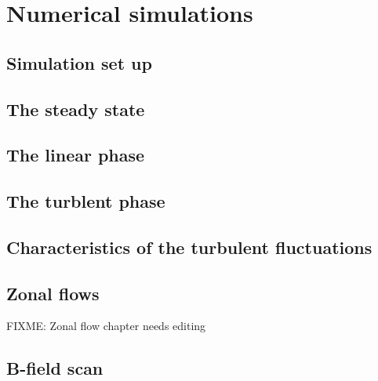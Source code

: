 \documentclass[12pt,a4paper,oneside,openright]{report} %
\begin{document}
% 
% 
% 
% 
% 
% 
% 
% 
%
\part{Numerical simulations}
\label{part:results}

\chapter{Simulation set up}

\chapter{The steady state}

\chapter{The linear phase}
\label{chap:linear}

\chapter{The turblent phase}
\label{chap:satTurb}

\chapter{Characteristics of the turbulent fluctuations}



\chapter{Zonal flows}
FIXME: Zonal flow chapter needs editing

\chapter{B-field scan}

\end{document}
